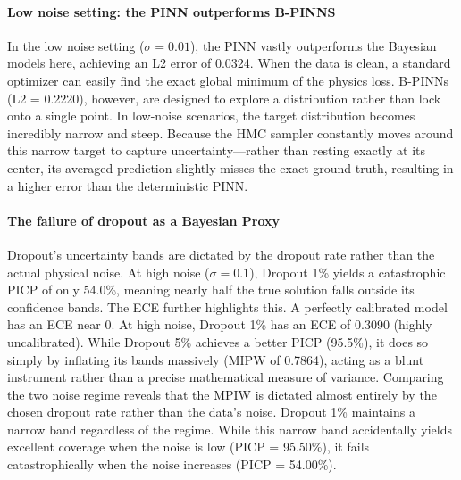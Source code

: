 \documentclass{article}
\begin{document}
\paragraph{Low noise setting: the PINN outperforms B-PINNS}  In the low noise setting ($\sigma = 0.01$), the PINN vastly outperforms the Bayesian models here, achieving an L2 error of 0.0324. When the data is clean, a standard optimizer can easily find the exact global minimum of the physics loss. 
B-PINNs (L2 = 0.2220), however, are designed to explore a distribution rather than lock onto a single point. In low-noise scenarios, the target distribution becomes incredibly narrow and steep. Because the HMC sampler constantly moves around this narrow target to capture uncertainty—rather than resting exactly at its center, its averaged prediction slightly misses the exact ground truth, resulting in a higher error than the deterministic PINN.

\paragraph{The failure of dropout as a Bayesian Proxy} Dropout's uncertainty bands are dictated by the dropout rate rather than the actual physical noise. At high noise ($\sigma=0.1$), Dropout 1\% yields a catastrophic PICP of only 54.0\%, meaning nearly half the true solution falls outside its confidence bands.  The ECE further highlights this. A perfectly calibrated model has an ECE near 0. At high noise, Dropout 1\% has an ECE of 0.3090 (highly uncalibrated). While Dropout 5\% achieves a better PICP (95.5\%), it does so simply by inflating its bands massively (MIPW of 0.7864), acting as a blunt instrument rather than a precise mathematical measure of variance. Comparing the two noise regime reveals that the MPIW  is dictated almost entirely by the chosen dropout rate rather than the data's noise. Dropout 1\% maintains a narrow band  regardless of the regime. While this narrow band accidentally yields excellent coverage when the noise is low (PICP = 95.50\%), it fails catastrophically when the noise increases (PICP = 54.00\%). 
\end{document}

